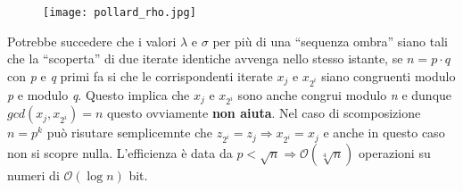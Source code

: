 \begin{figure}[h]
    \centering
    \texttt{[image: pollard\_rho.jpg]}
\end{figure}
Potrebbe succedere che i valori $\lambda$ e $\sigma$ per più di una ``sequenza ombra'' siano tali che la ``scoperta'' di due iterate identiche avvenga nello stesso istante, se $n = p \cdot q$ con \textit{p} e \textit{q} primi fa si che le corrispondenti iterate $x_j$ e $x_{2^i}$ siano congruenti modulo \textit{p} e modulo \textit{q}. Questo implica che $x_j$ e $x_{2^i}$ sono anche congrui modulo \textit{n} e dunque $gcd(x_j, x_{2^i}) = n$ questo ovviamente \textbf{non aiuta}. Nel caso di scomposizione $n = p^k$ può risutare semplicemnte che $z_{2^i} = z_j \Rightarrow x_{2^i} = x_j$ e anche in questo caso non si scopre nulla. L'efficienza è data da $p < \sqrt{n} \Rightarrow \mathcal{O}(\sqrt[4]{n})$ operazioni su numeri di $\mathcal{O}(\log{n})$ bit. 